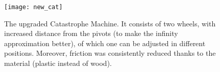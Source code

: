 \begin{figure}[h!]
	\centering
	\texttt{[image: new\_cat]}
	\caption{\small The upgraded Catastrophe Machine. It consists of two wheels, with increased distance from the pivots (to make the infinity approximation better), of which one can be adjusted in different positions. Moreover, friction was consistently reduced thanks to the material (plastic instead of wood).}
	\label{fig:newcat}
\end{figure}


